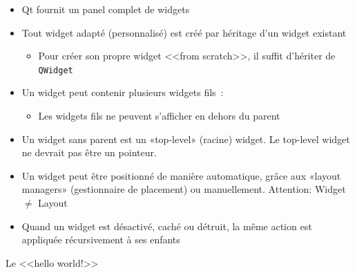\documentclass{beamer} %
\begin{document}
\begin{frame}
	\begin{itemize}
	\item Qt fournit un panel complet de widgets
	\item<2-> Tout widget adapté (personnalisé) est créé par héritage d'un widget existant
		\begin{itemize}
			\item<3-> Pour créer son propre widget <<from scratch>>, il suffit d'hériter de \texttt{QWidget}
		\end{itemize}
	\item<4-> Un widget peut contenir plusieurs widgets fils~:
		\begin{itemize}
			\item<5-> Les widgets fils ne peuvent s'afficher en dehors du parent 
		\end{itemize}
	\item<6-> Un widget sans parent est un «top-level» (racine) widget. \color{red} Le top-level widget ne devrait pas être un pointeur.\color{black}
	\item<7-> Un widget peut être positionné de manière automatique, grâce aux «layout managers» (gestionnaire de placement) ou manuellement. \color{red} Attention: Widget $ \not= $ Layout  \color{black}
	\item<8-> Quand un widget est désactivé, caché ou détruit, la même action est appliquée récursivement à ses enfants
	\end{itemize}
\end{frame}

\begin{frame}
	\begin{exampleblock}{Le <<hello world!>>}
		
	\end{exampleblock}
\end{frame}
\end{document}
